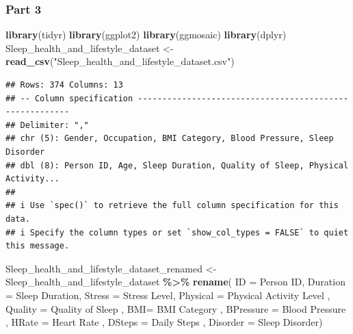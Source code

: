 \documentclass[
  11pt,
]{article}
\newenvironment{Shaded}{\begin{snugshade}}{\end{snugshade}}
\newcommand{\AttributeTok}[1]{\textcolor[rgb]{0.13,0.29,0.53}{#1}}
\newcommand{\FunctionTok}[1]{\textcolor[rgb]{0.13,0.29,0.53}{\textbf{#1}}}
\newcommand{\NormalTok}[1]{#1}
\newcommand{\OtherTok}[1]{\textcolor[rgb]{0.56,0.35,0.01}{#1}}
\newcommand{\SpecialCharTok}[1]{\textcolor[rgb]{0.81,0.36,0.00}{\textbf{#1}}}
\newcommand{\StringTok}[1]{\textcolor[rgb]{0.31,0.60,0.02}{#1}}
\begin{document}
\hypertarget{part-3}{%
\subsubsection{Part 3}\label{part-3}}

\begin{Shaded}
\begin{Highlighting}[]
\FunctionTok{library}\NormalTok{(tidyr)}
\FunctionTok{library}\NormalTok{(ggplot2)}
\FunctionTok{library}\NormalTok{(ggmosaic)}
\FunctionTok{library}\NormalTok{(dplyr)}
\NormalTok{Sleep\_health\_and\_lifestyle\_dataset }\OtherTok{\textless{}{-}} \FunctionTok{read\_csv}\NormalTok{(}\StringTok{"Sleep\_health\_and\_lifestyle\_dataset.csv"}\NormalTok{)}
\end{Highlighting}
\end{Shaded}

\begin{verbatim}
## Rows: 374 Columns: 13
## -- Column specification --------------------------------------------------------
## Delimiter: ","
## chr (5): Gender, Occupation, BMI Category, Blood Pressure, Sleep Disorder
## dbl (8): Person ID, Age, Sleep Duration, Quality of Sleep, Physical Activity...
## 
## i Use `spec()` to retrieve the full column specification for this data.
## i Specify the column types or set `show_col_types = FALSE` to quiet this message.
\end{verbatim}

\begin{Shaded}
\begin{Highlighting}[]
\NormalTok{Sleep\_health\_and\_lifestyle\_dataset\_renamed }\OtherTok{\textless{}{-}}\NormalTok{ Sleep\_health\_and\_lifestyle\_dataset }\SpecialCharTok{\%\textgreater{}\%}
  \FunctionTok{rename}\NormalTok{( }\AttributeTok{ID =} \StringTok{\textquotesingle{}Person ID\textquotesingle{}}\NormalTok{,}
          \AttributeTok{Duration =} \StringTok{\textquotesingle{}Sleep Duration\textquotesingle{}}\NormalTok{,}
          \AttributeTok{Stress =} \StringTok{\textquotesingle{}Stress Level\textquotesingle{}}\NormalTok{,}
          \AttributeTok{Physical =} \StringTok{\textquotesingle{}Physical Activity Level\textquotesingle{}}\NormalTok{ ,}
          \AttributeTok{Quality =} \StringTok{\textquotesingle{}Quality of Sleep\textquotesingle{}}\NormalTok{ ,}
          \AttributeTok{BMI=} \StringTok{\textquotesingle{}BMI Category\textquotesingle{}}\NormalTok{ ,}
          \AttributeTok{BPressure =} \StringTok{\textquotesingle{}Blood Pressure\textquotesingle{}}\NormalTok{ ,}
          \AttributeTok{HRate =} \StringTok{\textquotesingle{}Heart Rate\textquotesingle{}}\NormalTok{ ,}
          \AttributeTok{DSteps =} \StringTok{\textquotesingle{}Daily Steps\textquotesingle{}}\NormalTok{ ,}
          \AttributeTok{Disorder =} \StringTok{\textquotesingle{}Sleep Disorder\textquotesingle{}}\NormalTok{)}
\end{Highlighting}
\end{Shaded}
\end{document}
